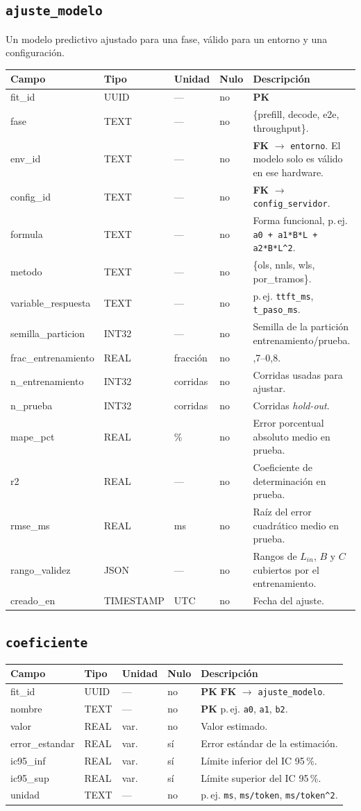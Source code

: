 \documentclass[11pt,a4paper]{article}
\makeatletter
\newcommand{\PK}{\textcolor{pkc}{\textbf{PK}}}
\newcommand{\FK}{\textcolor{fkc}{\textbf{FK}}}
\newenvironment{diccionario}{%
  \small
  \begin{longtable}{@{}>{\raggedright\ttfamily}p{3.4cm}>{\raggedright}p{2.2cm}>{\raggedright}p{1.6cm}p{0.9cm}>{\raggedright\arraybackslash}p{5.8cm}@{}}
  \toprule
  \normalfont\textbf{Campo} & \textbf{Tipo} & \textbf{Unidad} & \textbf{Nulo} & \textbf{Descripción}\\
  \midrule\endhead
  \bottomrule\endfoot
}{\end{longtable}}
\makeatother
\begin{document}
\subsection{\texttt{ajuste_modelo}}
Un modelo predictivo ajustado para una fase, válido para un entorno y una configuración.
\begin{diccionario}
fit_id & UUID & — & no & \PK{}\\
fase & TEXT & — & no & \{prefill, decode, e2e, throughput\}.\\
env_id & TEXT & — & no & \FK{} $\rightarrow$ \texttt{entorno}. El modelo solo es válido en ese hardware.\\
config_id & TEXT & — & no & \FK{} $\rightarrow$ \texttt{config_servidor}.\\
formula & TEXT & — & no & Forma funcional, p.\,ej. \texttt{a0 + a1*B*L + a2*B*L\^{}2}.\\
metodo & TEXT & — & no & \{ols, nnls, wls, por\_tramos\}.\\
variable_respuesta & TEXT & — & no & p.\,ej. \texttt{ttft_ms}, \texttt{t_paso_ms}.\\
semilla_particion & INT32 & — & no & Semilla de la partición entrenamiento/prueba.\\
frac_entrenamiento & REAL & fracción & no & 0,7–0,8.\\
n_entrenamiento & INT32 & corridas & no & Corridas usadas para ajustar.\\
n_prueba & INT32 & corridas & no & Corridas \emph{hold-out}.\\
mape_pct & REAL & \% & no & Error porcentual absoluto medio en prueba.\\
r2 & REAL & — & no & Coeficiente de determinación en prueba.\\
rmse_ms & REAL & ms & no & Raíz del error cuadrático medio en prueba.\\
rango_validez & JSON & — & no & Rangos de $L_{in}$, $B$ y $C$ cubiertos por el entrenamiento.\\
creado_en & TIMESTAMP & UTC & no & Fecha del ajuste.\\
\end{diccionario}

\subsection{\texttt{coeficiente}}
\begin{diccionario}
fit_id & UUID & — & no & \PK{} \FK{} $\rightarrow$ \texttt{ajuste_modelo}.\\
nombre & TEXT & — & no & \PK{} p.\,ej. \texttt{a0}, \texttt{a1}, \texttt{b2}.\\
valor & REAL & var. & no & Valor estimado.\\
error_estandar & REAL & var. & sí & Error estándar de la estimación.\\
ic95_inf & REAL & var. & sí & Límite inferior del IC 95\,\%.\\
ic95_sup & REAL & var. & sí & Límite superior del IC 95\,\%.\\
unidad & TEXT & — & no & p.\,ej. \texttt{ms}, \texttt{ms/token}, \texttt{ms/token\^{}2}.\\
\end{diccionario}
\end{document}
